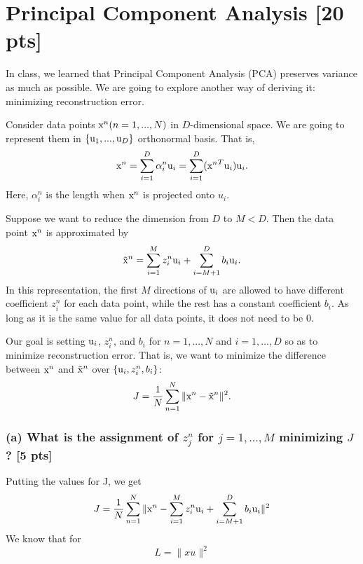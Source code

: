 \documentclass[twoside,10pt]{article}
\begin{document}
\section{Principal Component Analysis [20 pts]}
In class, we learned that Principal Component Analysis (PCA)
preserves variance as much as possible. We are going to explore
another way of deriving it: minimizing reconstruction error.

Consider data points $\text x^n (n=1, ..., N)$ in $D$-dimensional space.
We are going to represent them in $\{\text u_1, ..., \text u_D\}$ orthonormal basis.
That is,
\begin{equation} \nonumber
\text x^n = \sum_{i=1}^D \alpha_i^n \text u_i = \sum_{i=1}^D ({\text x^n}^T \text u_i) \text u_i.
\end{equation}
Here, $\alpha^n_i$ is the length when $\text x^n$ is projected onto
$u_i$.

Suppose we want to reduce the dimension from $D$ to $M < D$. Then
the data point $\text x^n$ is approximated by
\begin{equation} \nonumber
\tilde{\text x}^n = \sum_{i=1}^M z_i^n \text u_i + \sum_{i=M+1}^D b_i \text u_i.
\end{equation}
In this representation, the first $M$ directions of $\text u_i$ are
allowed to have different coefficient $z^n_i$ for each data point,
while the rest has a constant coefficient $b_i$. As long as it is
the same value for all data points, it does not need to be 0.

Our goal is setting $\text u_i$, $z^n_i$, and $b_i$ for $n = 1,..., N$
and $i = 1, ..., D$ so as to minimize reconstruction error. That is,
we want to minimize the difference between $\text x^n$ and $\tilde{\text x}^n$ over $\{ \text u_i, z^n_i, b_i \}$:
\begin{equation} \nonumber
J = \frac{1}{N} \sum_{n=1}^N \| \text x^n - \tilde{\text x}^n \|^2.
\end{equation}
\subsubsection*{(a) What is the assignment of $z_j^n$ for $j=1, ..., M$ minimizing $J$? [5 pts]}

Putting the values for J, we get \\
$$
J = \frac{1}{N} \sum_{n=1}^N \| \text x^n - \sum_{i=1}^M z_i^n \text u_i + \sum_{i=M+1}^D b_i \text u_i \|^2 \\
$$
We know that for
 $$
L = \|xu\|^2
 $$
\end{document}
